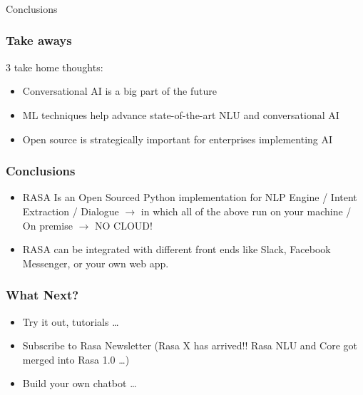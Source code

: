 \begin{frame}[fragile]\frametitle{}
\begin{center}
{\Large Conclusions}
\end{center}
\end{frame}

\begin{frame}\frametitle{Take aways}
3 take home thoughts:
\begin{itemize}
\item Conversational AI is a big part of the future
\item ML techniques help advance state-of-the-art NLU and conversational AI
\item  Open source is strategically important for enterprises 
implementing AI
\end{itemize}
\end{frame}

\begin{frame}\frametitle{Conclusions}
\begin{itemize}
\item RASA Is an Open Sourced Python implementation for NLP Engine / Intent Extraction / Dialogue $\rightarrow$ in which all of the above run on your machine / On premise $\rightarrow$ NO CLOUD!
\item RASA can be integrated with different front ends like Slack, Facebook Messenger, or your own web app.
\end{itemize}
\end{frame}

\begin{frame}\frametitle{What Next?}
\begin{itemize}
\item Try it out, tutorials \ldots
\item Subscribe to Rasa Newsletter (Rasa X has arrived!! Rasa NLU and Core got merged into Rasa 1.0 \ldots)
\item Build your own chatbot \ldots %
\end{itemize}
\end{frame}
